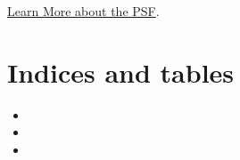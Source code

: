 \documentclass[letterpaper,10pt,english]{sphinxmanual}
\begin{document}
\href{http://www.python.org/psf/}{Learn More about the PSF}.


\chapter{Indices and tables}
\label{\detokenize{index:indices-and-tables}}\begin{itemize}
\item {} 

\item {} 

\item {} 

\end{itemize}



\renewcommand{\indexname}{Index}
\printindex
\end{document}
